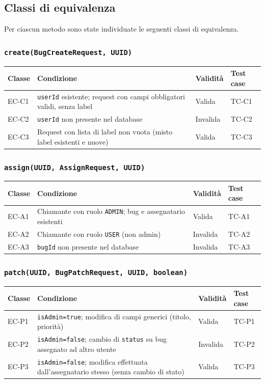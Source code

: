 ﻿\documentclass[a4paper,11pt]{article}
\begin{document}
\subsection{Classi di equivalenza}

Per ciascun metodo sono state individuate le seguenti classi di equivalenza.

\subsubsection{\texttt{create(BugCreateRequest, UUID)}}

\begin{tabular}{|l|p{6cm}|l|l|}
\hline
\textbf{Classe} & \textbf{Condizione} & \textbf{Validit\`a} & \textbf{Test case} \\
\hline
EC-C1 & \texttt{userId} esistente; request con campi obbligatori validi, senza label & Valida & TC-C1 \\
\hline
EC-C2 & \texttt{userId} non presente nel database & Invalida & TC-C2 \\
\hline
EC-C3 & Request con lista di label non vuota (misto label esistenti e nuove) & Valida & TC-C3 \\
\hline
\end{tabular}

\subsubsection{\texttt{assign(UUID, AssignRequest, UUID)}}

\begin{tabular}{|l|p{6cm}|l|l|}
\hline
\textbf{Classe} & \textbf{Condizione} & \textbf{Validit\`a} & \textbf{Test case} \\
\hline
EC-A1 & Chiamante con ruolo \texttt{ADMIN}; bug e assegnatario esistenti & Valida & TC-A1 \\
\hline
EC-A2 & Chiamante con ruolo \texttt{USER} (non admin) & Invalida & TC-A2 \\
\hline
EC-A3 & \texttt{bugId} non presente nel database & Invalida & TC-A3 \\
\hline
\end{tabular}

\subsubsection{\texttt{patch(UUID, BugPatchRequest, UUID, boolean)}}

\begin{tabular}{|l|p{6cm}|l|l|}
\hline
\textbf{Classe} & \textbf{Condizione} & \textbf{Validit\`a} & \textbf{Test case} \\
\hline
EC-P1 & \texttt{isAdmin=true}; modifica di campi generici (titolo, priorit\`a) & Valida & TC-P1 \\
\hline
EC-P2 & \texttt{isAdmin=false}; cambio di \texttt{status} su bug assegnato ad altro utente & Invalida & TC-P2 \\
\hline
EC-P3 & \texttt{isAdmin=false}; modifica effettuata dall'assegnatario stesso (senza cambio di stato) & Valida & TC-P3 \\
\hline
\end{tabular}
\end{document}

